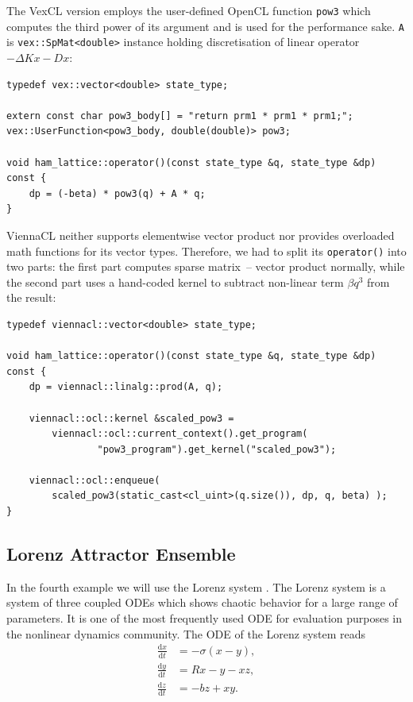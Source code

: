 \documentclass[1p]{elsarticle}
\newcommand{\code}[1]{\lstinline|#1|}
\newcommand {\de} {\mbox{d}}
\begin{document}
The VexCL version employs the user-defined OpenCL function \code{pow3} which
computes the third power of its argument and is used for the performance sake.
\code{A} is \code{vex::SpMat<double>} instance holding discretisation of linear
operator $-\Delta Kx - Dx$:
\begin{lstlisting}
typedef vex::vector<double> state_type;

extern const char pow3_body[] = "return prm1 * prm1 * prm1;";
vex::UserFunction<pow3_body, double(double)> pow3;

void ham_lattice::operator()(const state_type &q, state_type &dp) const {
    dp = (-beta) * pow3(q) + A * q;
}
\end{lstlisting}

ViennaCL neither supports elementwise vector product nor provides
overloaded math functions for its vector types. Therefore, we had to split its
\code{operator()} into two parts: the first part computes sparse matrix~--
vector product normally, while the second part uses a hand-coded kernel to
subtract non-linear term $\beta q^3$ from the result:
\begin{lstlisting}
typedef viennacl::vector<double> state_type;

void ham_lattice::operator()(const state_type &q, state_type &dp) const {
    dp = viennacl::linalg::prod(A, q);

    viennacl::ocl::kernel &scaled_pow3 =
        viennacl::ocl::current_context().get_program(
                "pow3_program").get_kernel("scaled_pow3");

    viennacl::ocl::enqueue(
        scaled_pow3(static_cast<cl_uint>(q.size()), dp, q, beta) );
}
\end{lstlisting}









%
%
\subsection{Lorenz Attractor Ensemble}

In the fourth example we will use the Lorenz system \cite{Lorenz-63}. The
Lorenz system is a system of three coupled ODEs which shows chaotic
behavior for a large range of parameters. It is one of the most frequently
used ODE for evaluation purposes in the nonlinear dynamics community.
The ODE of the Lorenz system reads
\begin{align}
    \frac{\de x}{\de t} &= -\sigma \left( x - y \right), \\
    \frac{\de y}{\de t} &= R x - y - xz, \\
    \frac{\de z}{\de t} &= -bz + xy.
\end{align}
\end{document}

